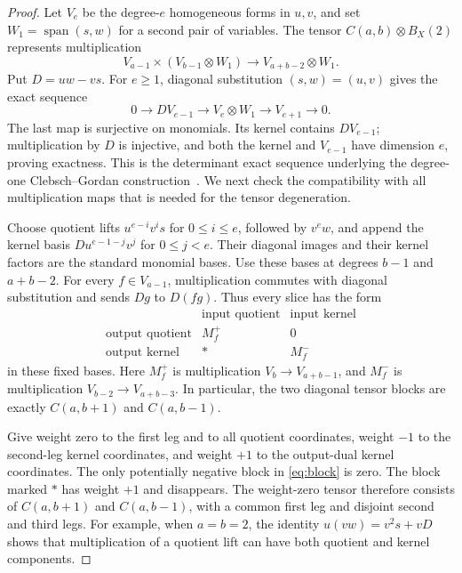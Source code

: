 \documentclass[11pt]{article}
\theoremstyle{definition}
\theoremstyle{remark}
\numberwithin{equation}{section}
\begin{document}
\begin{proof}
Let $V_e$ be the degree-$e$ homogeneous forms in $u,v$, and set
$W_1=\operatorname{span}(s,w)$ for a second pair of variables.
The tensor $C(a,b)\otimes B_X(2)$ represents multiplication
\[
 V_{a-1}\times(V_{b-1}\otimes W_1)
 \longrightarrow V_{a+b-2}\otimes W_1.
\]
Put $D=uw-vs$. For $e\geq1$, diagonal substitution
$(s,w)=(u,v)$ gives the exact sequence
\begin{equation}\label{eq:det-sequence}
 0\longrightarrow D V_{e-1}
 \longrightarrow V_e\otimes W_1
 \longrightarrow V_{e+1}\longrightarrow0.
\end{equation}
The last map is surjective on monomials. Its kernel contains
$DV_{e-1}$; multiplication by $D$ is injective, and both the kernel
and $V_{e-1}$ have dimension $e$, proving exactness.
This is the determinant exact sequence underlying the degree-one
Clebsch--Gordan construction~\cite[Section~2.6 of the author version]{Kow14}.
We next check the compatibility with all multiplication maps that is
needed for the tensor degeneration.

Choose quotient lifts
$u^{e-i}v^i s$ for $0\leq i\leq e$, followed by $v^e w$,
and append the kernel basis $D u^{e-1-j}v^j$ for $0\leq j<e$.
Their diagonal images and their kernel factors are the standard
monomial bases. Use these bases at degrees $b-1$ and $a+b-2$.
For every $f\in V_{a-1}$, multiplication commutes with diagonal
substitution and sends $Dg$ to $D(fg)$. Thus every slice has the form
\begin{equation}\label{eq:block}
 \begin{array}{c|cc}
  &\text{input quotient}&\text{input kernel}\\ \hline
  \text{output quotient}&M_f^{+}&0\\
  \text{output kernel}& * &M_f^{-}
 \end{array}
\end{equation}
in these fixed bases. Here $M_f^{+}$ is multiplication
$V_b\to V_{a+b-1}$, and $M_f^{-}$ is multiplication
$V_{b-2}\to V_{a+b-3}$. In particular, the two diagonal tensor blocks
are exactly $C(a,b+1)$ and $C(a,b-1)$.

Give weight zero to the first leg and to all quotient coordinates,
weight $-1$ to the second-leg kernel coordinates, and weight $+1$
to the output-dual kernel coordinates. The only potentially negative
block in \eqref{eq:block} is zero. The block marked $*$ has weight
$+1$ and disappears. The weight-zero tensor therefore consists of
$C(a,b+1)$ and $C(a,b-1)$, with a common first leg and disjoint second
and third legs.
For example, when $a=b=2$, the identity
$u(vw)=v^2s+vD$ shows that multiplication of a quotient lift can have
both quotient and kernel components.


\end{proof}
\end{document}
